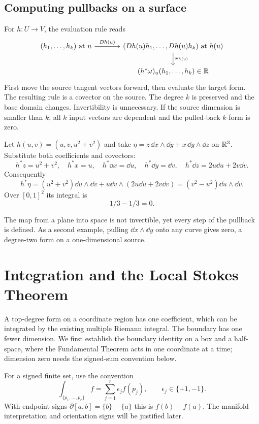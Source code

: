 \subsection{Computing pullbacks on a surface}
For $h:U\to V$, the evaluation rule reads
\[
\begin{tikzcd}[column sep=large]
(h_1,\ldots,h_k)\text{ at }u\arrow[r,"Dh(u)"]
&(Dh(u)h_1,\ldots,Dh(u)h_k)\text{ at }h(u)
\arrow[d,"\omega_{h(u)}"]\\
&(h^*\omega)_u(h_1,\ldots,h_k)\in\R
\end{tikzcd}
\]
First move the source tangent vectors forward, then evaluate the target
form. The resulting rule is a covector on the source. The degree $k$
is preserved and the base domain changes. Invertibility is unnecessary.
If the source dimension is smaller than $k$, all $k$ input vectors are
dependent and the pulled-back $k$-form is zero.
\begin{example}
Let $h(u,v)=(u,v,u^2+v^2)$ and take
$\eta=z\,\dd x\wedge\dd y+x\,\dd y\wedge\dd z$ on $\mathbb{R}^3$.
Substitute both coefficients and covectors:
\[
h^*z=u^2+v^2,\quad h^*x=u,\quad
h^*\dd x=\dd u,\quad h^*\dd y=\dd v,\quad
h^*\dd z=2u\dd u+2v\dd v.
\]
Consequently
\[
h^*\eta=(u^2+v^2)\dd u\wedge\dd v
+u\dd v\wedge(2u\dd u+2v\dd v)
=(v^2-u^2)\dd u\wedge\dd v.
\]
Over $[0,1]^2$ its integral is
\[
1/3-1/3=0.
\]

The map from a plane into space is not invertible, yet every step of the
pullback is defined. As a second example, pulling $\dd x\wedge\dd y$
onto any curve gives zero, a degree-two form on a one-dimensional source.
\end{example}
\section{Integration and the Local Stokes Theorem}

A top-degree form on a coordinate region has one coefficient, which can
be integrated by the existing multiple Riemann integral. The boundary has
one fewer dimension. We first establish the boundary identity on a box
and a half-space, where the Fundamental Theorem acts in one coordinate
at a time; dimension zero needs the signed-sum convention below.


For a signed finite set, use the convention
\[
\int_{\{p_1,\ldots,p_r\}}f=\sum_{j=1}^r\epsilon_j f(p_j),
\qquad\epsilon_j\in\{+1,-1\}.
\]
With endpoint signs $\partial[a,b]=\{b\}-\{a\}$ this is $f(b)-f(a)$.
The manifold interpretation and orientation signs will be justified later.

